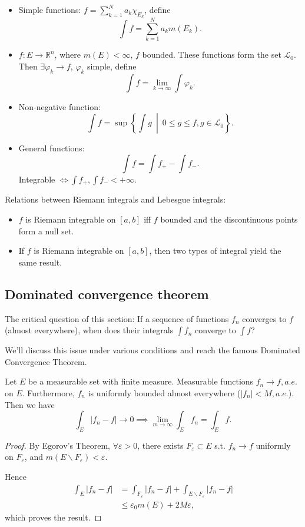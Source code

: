 \begin{itemize}
	\item Simple functions:
		$f=\sum_{k=1}^N a_k\chi_{E_k}$, define
		\[
			\int f = \sum_{k=1}^N a_km(E_k)
		.\]
	\item $f: E\to \mathbb{R}^n$, where $m(E)<\infty$, $f$ bounded.
		These functions form the set $\mathcal{L}_0$.
		Then $\exists \varphi_k \to f$,  $\varphi_k$ simple, define
		 \[
		\int f = \lim_{k\to \infty}\int \varphi_k
        .\]
	\item Non-negative function:
		\[
			\int f = \sup \left\{\int g\ \middle|\ 0\le g\le f, g\in \mathcal{L}_0\right\}
		.\]
	\item General functions:
		\[
		\int f = \int f_+ - \int f_-
		.\]
		Integrable $\iff \int f_+, \int f_- < +\infty$.
\end{itemize}

Relations between Riemann integrals and Lebesgue integrals:
\begin{itemize}
	\item $f$ is Riemann integrable on $[a,b]$ iff
		$f$ bounded and the discontinuous points form a null set.
	\item If $f$ is Riemann integrable on $[a,b]$, then
		two types of integral yield the same result.
\end{itemize}

\subsection{Dominated convergence theorem}
\label{sub:Dominated convergence theorem}
The critical question of this section:
If a sequence of functions $f_n$ converges to $f$ (almost everywhere),
when does their integrals $\int f_n$ converge to  $\int f$?

We'll discuss this issue under various conditions and reach the
famous Dominated Convergence Theorem.

\begin{theorem}
	\label{thm:bounded convergence}
    Let $E$ be a measurable set with finite measure.
    Measurable functions $f_n\to f, a.e.$ on $E$.
	Furthermore, $f_n$ is uniformly bounded almost everywhere ($|f_n|<M,a.e.$).
	Then we have
	\[
	\int_E |f_n-f|\to 0 \implies \lim_{m\to \infty}\int_E f_n = \int_E f
	.\]
\end{theorem}
\begin{proof}[Proof]
    By Egorov's Theorem, $\forall \varepsilon>0$,
    there exists $F_\varepsilon \subset E$ s.t.
    $f_n\to f$ uniformly on $F_\varepsilon$,
    and $m(E\backslash F_\varepsilon)<\varepsilon$.
    
    Hence
    \begin{align*}
    \int_E|f_n-f| &= \int_{F_\varepsilon} |f_n-f| +
    \int_{E\backslash F_\varepsilon} |f_n-f|\\
    &\le \varepsilon_0 m(E) + 2M \varepsilon,
    \end{align*}
	which proves the result.
\end{proof}

